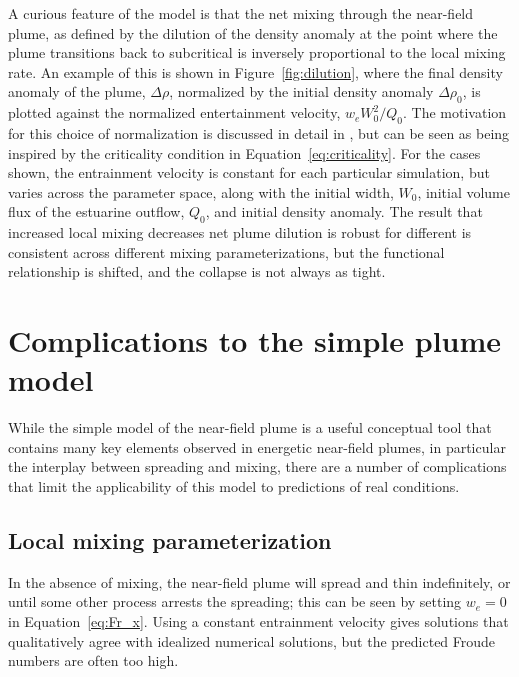 \documentclass[12pt]{article}
\begin{document}
A curious feature of the model is that the net mixing through the near-field plume, as defined by the dilution of the density anomaly at the point where the plume transitions back to subcritical is inversely proportional to the local mixing rate. An example of this is shown in Figure~\ref{fig:dilution}, where the final density anomaly of the plume, $\Delta \rho$, normalized by the initial density anomaly $\Delta \rho_0$, is plotted against the normalized entertainment velocity, $w_e W_0^2 / Q_0$. The motivation for this choice of normalization is discussed in detail in \citet{hetland:10a}, but can be seen as being inspired by the criticality condition in Equation~\ref{eq:criticality}. For the cases shown, the entrainment velocity is constant for each particular simulation, but varies across the parameter space, along with the initial width, $W_0$, initial volume flux of the estuarine outflow, $Q_0$, and initial density anomaly. The result that increased local mixing decreases net plume dilution is robust for different is consistent across different mixing parameterizations, but the functional relationship is shifted, and the collapse is not always as tight.


\section{Complications to the simple plume model}

While the simple model of the near-field plume is a useful conceptual tool that contains many key elements observed in energetic near-field plumes, in particular the interplay between spreading and mixing, there are a number of complications that limit the applicability of this model to predictions of real conditions.

\subsection{Local mixing parameterization}

In the absence of mixing, the near-field plume will spread and thin indefinitely, or until some other process arrests the spreading; this can be seen by setting $w_e=0$ in Equation~\ref{eq:Fr_x}. Using a constant entrainment velocity gives solutions that qualitatively agree with idealized numerical solutions, but the predicted Froude numbers are often too high. 
\end{document}
